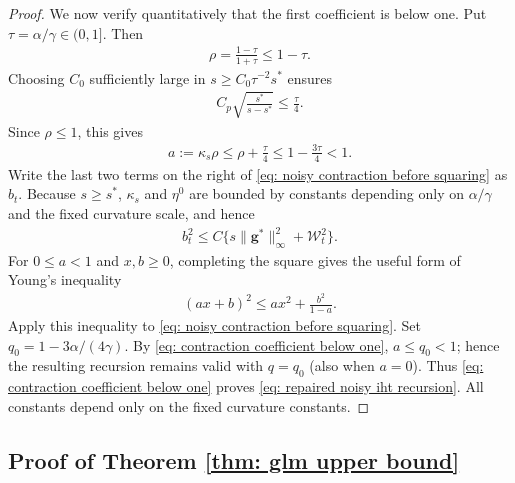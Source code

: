 \documentclass[letterpaper,12pt]{article}
\numberwithin{equation}{section}
\theoremstyle{plain}
\numberwithin{Theorem}{section}
\numberwithin{proposition}{section}
\numberwithin{Lemma}{section}
{
	\theoremstyle{definition}
	\newtheorem{Definition}{Definition}
	\newtheorem{example}{Example}
	\numberwithin{example}{section}
	\newtheorem{fact}{Fact}
	\numberwithin{fact}{section}
	\newtheorem{remark}{Remark}
}
\newcommand{\furtherrev}[1]{#1}
\newcommand{\1}{\mathbbm{1}}
\begin{document}
\begin{proof}
We now verify quantitatively that the first coefficient is below one.
Put $\tau=\alpha/\gamma\in(0,1]$.  Then
\begin{align*}
    \rho=\frac{1-\tau}{1+\tau}\leq1-\tau.
\end{align*}
Choosing $C_0$ sufficiently large in
$s\geq C_0\tau^{-2}s^*$ ensures
\begin{align*}
    C_p\sqrt{\frac{s^*}{s-s^*}}\leq\frac\tau4.
\end{align*}
Since $\rho\leq1$, this gives
\begin{align}
    a:=\kappa_s\rho
    \leq\rho+\frac\tau4
    \leq1-\frac{3\tau}{4}<1.                              \label{eq: contraction coefficient below one}
\end{align}
Write the last two terms on the right of
\eqref{eq: noisy contraction before squaring} as $b_t$.  Because
$s\geq s^*$, $\kappa_s$ and $\eta^0$ are bounded by constants depending
only on $\alpha/\gamma$ and the fixed curvature scale, and hence
\begin{align*}
    b_t^2\leq C\{s\|\bm g^*\|_\infty^2+\mathcal W_t^2\}.
\end{align*}
For $0\leq a<1$ and $x,b\geq0$, completing the square gives the useful
form of Young's inequality
\begin{align*}
    (ax+b)^2\leq ax^2+\frac{b^2}{1-a}.
\end{align*}
Apply this inequality to \eqref{eq: noisy contraction before
squaring}.  \furtherrev{Set $q_0=1-3\alpha/(4\gamma)$. By
\eqref{eq: contraction coefficient below one}, $a\leq q_0<1$; hence
the resulting recursion remains valid with $q=q_0$ (also when $a=0$).}
Thus \eqref{eq: contraction coefficient below one} proves
\eqref{eq: repaired noisy iht recursion}.  All constants depend only
on the fixed curvature constants.
\end{proof}

\subsection{Proof of Theorem \ref{thm: glm upper bound}}\label{sec: proof of thm: glm upper bound}
\end{document}
